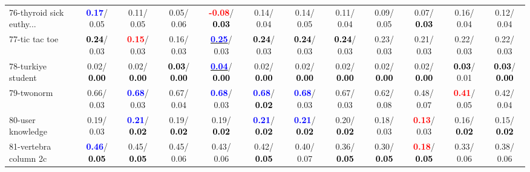 \begin{table}[h]
\begin{center}
{\begin{tabular}{lc|c|c|c|c|c|c|c|c|c|c}
76-thyroid sick euthy... & \textcolor{blue}{\textbf{  0.17}}/  0.05 &   0.11/  0.05 &   0.05/  0.06 & \textcolor{red}{\textbf{ -0.08}}/\textcolor{black}{\textbf{  0.03}} &   0.14/  0.04 &   0.14/  0.05 &   0.11/  0.04 &   0.09/  0.05 &   0.07/\textcolor{black}{\textbf{  0.03}} &   0.16/  0.04 &   0.12/  0.04 \\
77-tic tac toe & \textcolor{black}{\textbf{  0.24}}/  0.03 & \textcolor{red}{\textbf{  0.15}}/  0.03 &   0.16/  0.03 & \underline{\textcolor{blue}{\textbf{  0.25}}}/  0.03 & \textcolor{black}{\textbf{  0.24}}/  0.03 & \textcolor{black}{\textbf{  0.24}}/  0.03 & \textcolor{black}{\textbf{  0.24}}/  0.03 &   0.23/  0.03 &   0.21/  0.03 &   0.22/  0.03 &   0.22/  0.03 \\
78-turkiye student &   0.02/\textcolor{black}{\textbf{  0.00}} &   0.02/\textcolor{black}{\textbf{  0.00}} & \textcolor{black}{\textbf{  0.03}}/\textcolor{black}{\textbf{  0.00}} & \underline{\textcolor{blue}{\textbf{  0.04}}}/\textcolor{black}{\textbf{  0.00}} &   0.02/\textcolor{black}{\textbf{  0.00}} &   0.02/\textcolor{black}{\textbf{  0.00}} &   0.02/\textcolor{black}{\textbf{  0.00}} &   0.02/\textcolor{black}{\textbf{  0.00}} &   0.02/\textcolor{black}{\textbf{  0.00}} & \textcolor{black}{\textbf{  0.03}}/  0.01 & \textcolor{black}{\textbf{  0.03}}/\textcolor{black}{\textbf{  0.00}} \\ \hline
79-twonorm &   0.66/  0.03 & \textcolor{blue}{\textbf{  0.68}}/  0.03 &   0.67/  0.04 & \textcolor{blue}{\textbf{  0.68}}/  0.03 & \textcolor{blue}{\textbf{  0.68}}/\textcolor{black}{\textbf{  0.02}} & \textcolor{blue}{\textbf{  0.68}}/  0.03 &   0.67/  0.03 &   0.62/  0.08 &   0.48/  0.07 & \textcolor{red}{\textbf{  0.41}}/  0.05 &   0.42/  0.04 \\
80-user knowledge &   0.19/  0.03 & \textcolor{blue}{\textbf{  0.21}}/\textcolor{black}{\textbf{  0.02}} &   0.19/\textcolor{black}{\textbf{  0.02}} &   0.19/\textcolor{black}{\textbf{  0.02}} & \textcolor{blue}{\textbf{  0.21}}/\textcolor{black}{\textbf{  0.02}} & \textcolor{blue}{\textbf{  0.21}}/\textcolor{black}{\textbf{  0.02}} &   0.20/\textcolor{black}{\textbf{  0.02}} &   0.18/  0.03 & \textcolor{red}{\textbf{  0.13}}/  0.03 &   0.16/\textcolor{black}{\textbf{  0.02}} &   0.15/\textcolor{black}{\textbf{  0.02}} \\
81-vertebra column 2c & \textcolor{blue}{\textbf{  0.46}}/\textcolor{black}{\textbf{  0.05}} &   0.45/\textcolor{black}{\textbf{  0.05}} &   0.45/  0.06 &   0.43/  0.06 &   0.42/\textcolor{black}{\textbf{  0.05}} &   0.40/  0.07 &   0.36/\textcolor{black}{\textbf{  0.05}} &   0.30/\textcolor{black}{\textbf{  0.05}} & \textcolor{red}{\textbf{  0.18}}/\textcolor{black}{\textbf{  0.05}} &   0.33/  0.06 &   0.38/  0.06 \\

\end{tabular}}
\end{center}
\end{table}
